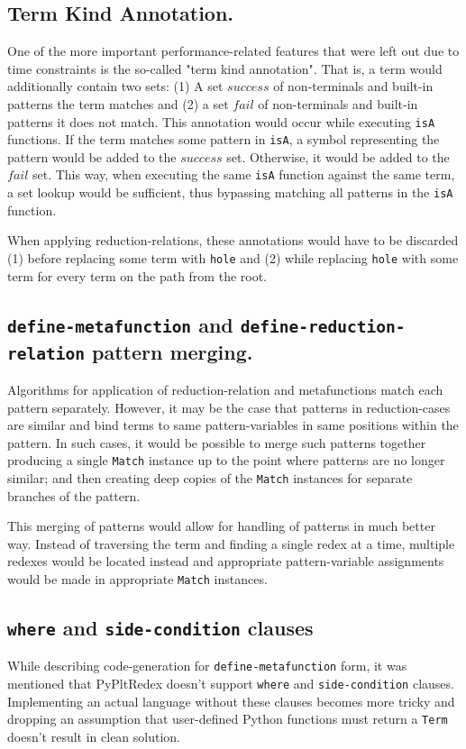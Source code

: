 \subsection{Term Kind Annotation.}
One of the more important performance-related features that were left out due to time constraints is the so-called "term kind annotation". That is, a term would additionally contain two sets: (1) A set $success$ of non-terminals and built-in patterns the term matches and (2) a set $fail$ of non-terminals and built-in patterns it does not match. This annotation would occur while executing \texttt{isA} functions. If the term matches some pattern in \texttt{isA}, a symbol representing the pattern would be added to the $success$ set. Otherwise, it would be added to the $fail$ set. This way, when executing the same \texttt{isA} function against the same term, a set lookup would be sufficient, thus bypassing matching all patterns in the \texttt{isA} function.

When applying reduction-relations, these annotations would have to be discarded (1) before replacing some term with \texttt{hole} and (2) while replacing \texttt{hole} with some term for every term on the path from the root.


\subsection{\texttt{define-metafunction} and \texttt{define-reduction-relation} pattern merging.}

Algorithms for application of reduction-relation and metafunctions match each pattern separately. However, it may be the case that patterns in reduction-cases are similar and bind terms to same pattern-variables in same positions within the pattern. In such cases, it would be possible to merge such patterns together producing a single \texttt{Match} instance up to the point where patterns are no longer similar; and then creating deep copies of the \texttt{Match} instances for separate branches of the pattern.

This merging of patterns would allow for handling of \PatternInHoleNoArg patterns in much better way. Instead of traversing the term and finding a single redex at a time, multiple redexes would be located instead and appropriate pattern-variable assignments would be made in appropriate \texttt{Match} instances. 

\subsection{\texttt{where} and \texttt{side-condition} clauses}
While describing code-generation for \texttt{define-metafunction} form, it was mentioned that PyPltRedex doesn't support \texttt{where} and \texttt{side-condition} clauses. Implementing an actual language without these clauses becomes more tricky and dropping an assumption that user-defined Python functions must return a \texttt{Term} doesn't result in clean solution.

